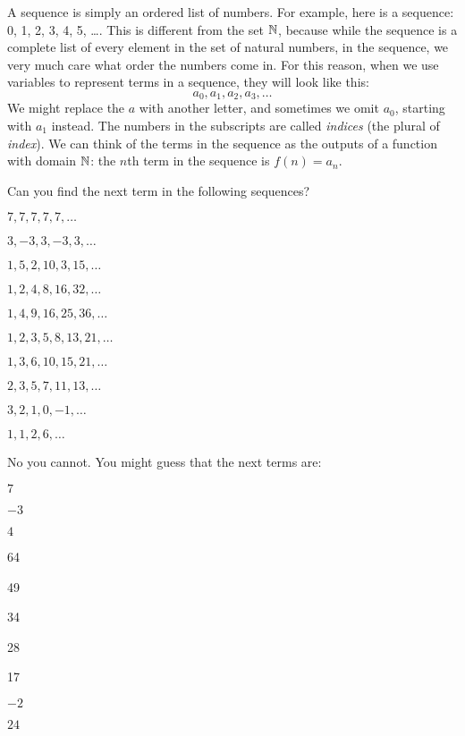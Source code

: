 \documentclass[12pt]{article}
\begin{document}
A sequence is simply an ordered list of numbers.  For example, here is a sequence: 0, 1, 2, 3, 4, 5, \ldots.  This is different from the set $\mathbb N$, because while the sequence is a complete list of every element in the set of natural numbers, in the sequence, we very much care what order the numbers come in.  For this reason, when we use variables to represent terms in a sequence, they will look like this:
\[a_0, a_1, a_2, a_3, \ldots\]
We might replace the $a$ with another letter, and sometimes we omit $a_0$, starting with $a_1$ instead.  The numbers in the subscripts are called {\em indices} (the plural of {\em index}).  We can think of the terms in the sequence as the outputs of a function with domain $\mathbb N$: the $n$th term in the sequence is $f(n) = a_n$.


\begin{example}
Can you find the next term in the following sequences?
\begin{enumerate}


\begin{multicols}{2}
		\item $7,7,7,7,7, \ldots$
		\item $3, -3, 3, -3, 3, \ldots$
		\item $1, 5, 2, 10, 3, 15, \ldots$
		\item $1, 2, 4, 8, 16, 32, \ldots$
		\item $1, 4, 9, 16, 25, 36, \ldots$
		\item $1, 2, 3, 5, 8, 13, 21, \ldots$
		\item $1, 3, 6, 10, 15, 21, \ldots$
		\item $2, 3, 5, 7, 11, 13, \ldots$
		\item $3, 2, 1, 0, -1, \ldots$
		\item $1, 1, 2, 6, \ldots$ 
		\end{multicols}
	\end{enumerate}
	\begin{solution}
	 No you cannot.  You might guess that the next terms are: 
	 \begin{enumerate}
	  \begin{multicols}{4}
	  \item $7$
	  \item $-3$
	  		\item $4$
		\item 64
		\item 49
		\item 34
		\item 28
		\item 17
		\item $-2$
		\item $24$
	  \end{multicols}


\end{enumerate}
\end{solution}
\end{example}
\end{document}
